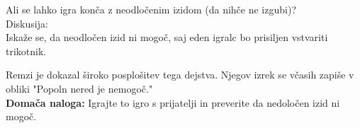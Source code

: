\noindent
Ali se lahko igra konča z neodločenim izidom (da nihče ne izgubi)? \\

\noindent
Diskusija: \\
Iskaže se, da neodločen izid ni mogoč, saj eden igralc bo prisiljen vstvariti trikotnik.
\begin{center}
\end{center}
Remzi je dokazal široko posplošitev tega dejstva. Njegov izrek se včasih zapiše v obliki "Popoln nered je nemogoč." \\

\noindent
\textbf{Domača naloga:} Igrajte to igro s prijatelji in preverite da nedoločen izid ni mogoč.
